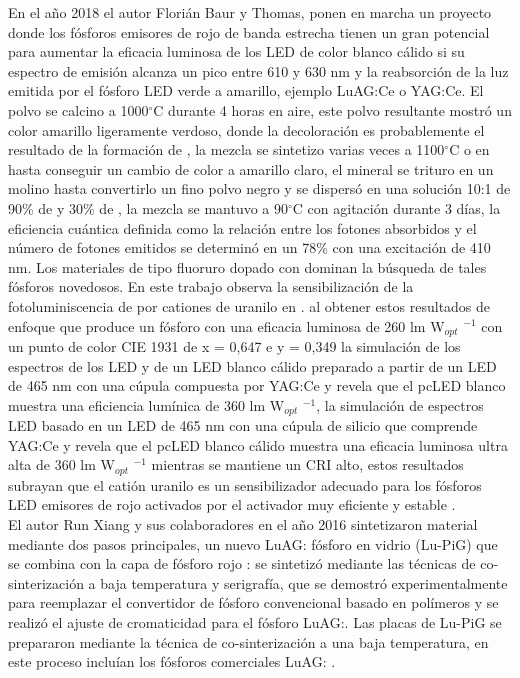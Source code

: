 En el año 2018 el autor Florián Baur y Thomas, ponen en marcha un proyecto
donde los fósforos emisores de rojo de banda estrecha tienen un gran potencial
para aumentar la eficacia luminosa de los LED de color blanco cálido si su
espectro de emisión alcanza un pico entre 610 y 630 nm y la reabsorción de la
luz emitida por el fósforo LED verde a amarillo, ejemplo LuAG:Ce o YAG:Ce. El
polvo se calcino a 1000$^{\circ}$C durante 4 horas en aire, este polvo resultante mostró
un color amarillo ligeramente verdoso, donde la decoloración es probablemente
el resultado de la formación de , la mezcla se sintetizo varias
veces a 1100$^{\circ}$C o en  hasta conseguir un cambio de color a amarillo
claro, el mineral se trituro en un molino hasta convertirlo un fino polvo negro
y se dispersó en una solución 10:1 de 90\% de   y 30\% de  ,
la mezcla se mantuvo a 90$^{\circ}$C con agitación durante 3 días, la eficiencia
cuántica definida como la relación entre los fotones absorbidos y el número de
fotones emitidos se determinó en un 78\% con una excitación de 410 nm. Los
materiales de tipo fluoruro dopado con  dominan la búsqueda de
tales fósforos novedosos. En este trabajo observa la sensibilización de la
fotoluminiscencia de  por cationes de uranilo en
. al obtener estos resultados de enfoque que produce un
fósforo con una eficacia luminosa de 260 lm W$_{opt}$ $^{-1}$ con un punto de
color CIE 1931 de x = 0,647 e y = 0,349 la simulación de los espectros de los
LED y de un LED blanco cálido preparado a partir de un LED de 465 nm con una
cúpula compuesta por YAG:Ce y  revela que el pcLED blanco
muestra una eficiencia lumínica  de 360 lm W$_{opt}$ $^{-1}$, la simulación de
espectros LED basado en un LED de 465 nm con una cúpula de silicio que
comprende YAG:Ce y  revela que el pcLED blanco cálido
muestra una eficacia luminosa ultra alta de 360 lm W$_{opt}$ $^{-1}$
mientras se mantiene un CRI alto, estos resultados subrayan que el catión
uranilo es un sensibilizador adecuado para los fósforos LED emisores de rojo
activados por el activador muy eficiente y estable
\cite{Baur2018,LiuFlux}.\\

El autor Run Xiang y sus colaboradores en el año 2016 sintetizaron material
mediante dos pasos principales, un nuevo LuAG: fósforo en vidrio
(Lu-PiG) que se combina con la capa de fósforo rojo :
se sintetizó mediante las técnicas de co-sinterización a baja temperatura y
serigrafía, que se demostró experimentalmente para reemplazar el convertidor de
fósforo convencional basado en polímeros y se realizó el ajuste de cromaticidad
para el fósforo LuAG:. Las placas de Lu-PiG se prepararon mediante
la técnica de co-sinterización a una baja temperatura, en este proceso incluían
los fósforos comerciales LuAG: \cite{Han2019,Peng2020}.\\

